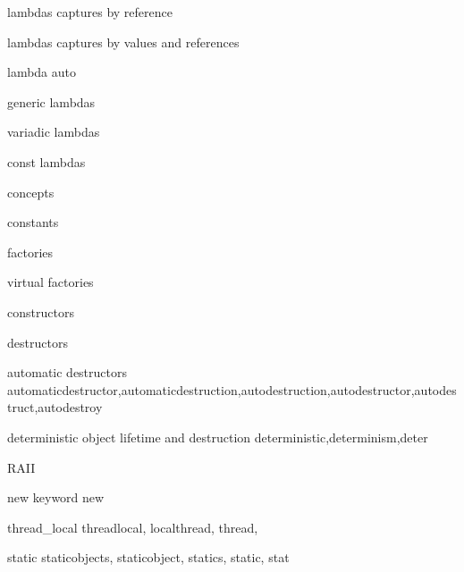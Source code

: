          lambdas captures by reference 
        
         lambdas captures by values and references 
        
         lambda auto
        
         generic lambdas
        
         variadic lambdas 
        
         const lambdas 
        
         concepts 
        
         constants 
        
         factories 
        
         virtual factories 
        
         constructors 
        
         destructors
        
         automatic destructors 
        automaticdestructor,automaticdestruction,autodestruction,autodestructor,autodestruct,autodestroy  
        
         deterministic object lifetime and destruction
        deterministic,determinism,deter
        
         RAII 
        
         new keyword 
        new
        
         thread_local
        threadlocal,
        localthread,
        thread,
        
         static 
        staticobjects,
        staticobject,
        statics,
        static,
        stat 
        
